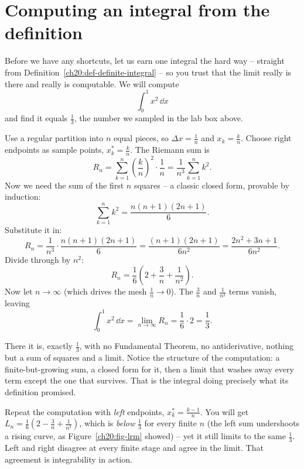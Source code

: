\section{Computing an integral from the definition}
\label{ch20:from-def}

Before we have any shortcuts, let us earn one integral the hard way -- straight
from Definition~\ref{ch20:def-definite-integral} -- so you trust that the limit
really is there and really is computable. We will compute
\[
  \int_0^1 x^2 \, \dd x
\]
and find it equals $\tfrac13$, the number we sampled in the lab box above.

\begin{example}
\label{ch20:ex-x2}
Use a regular partition into $n$ equal pieces, so $\Delta x = \tfrac1n$ and
$x_k = \tfrac{k}{n}$. Choose right endpoints as sample points, $x_k^\ast =
\tfrac{k}{n}$. The Riemann sum is
\[
  R_n = \sum_{k=1}^{n} \left(\frac{k}{n}\right)^2 \cdot \frac{1}{n}
      = \frac{1}{n^3} \sum_{k=1}^{n} k^2.
\]
Now we need the sum of the first $n$ squares -- a classic closed form,
provable by induction:
\[
  \sum_{k=1}^{n} k^2 = \frac{n(n+1)(2n+1)}{6}.
\]
Substitute it in:
\[
  R_n = \frac{1}{n^3} \cdot \frac{n(n+1)(2n+1)}{6}
      = \frac{(n+1)(2n+1)}{6n^2}
      = \frac{2n^2 + 3n + 1}{6n^2}.
\]
Divide through by $n^2$:
\[
  R_n = \frac{1}{6}\left(2 + \frac{3}{n} + \frac{1}{n^2}\right).
\]
Now let $n \to \infty$ (which drives the mesh $\tfrac1n \to 0$). The
$\tfrac{3}{n}$ and $\tfrac{1}{n^2}$ terms vanish, leaving
\[
  \int_0^1 x^2 \,\dd x = \lim_{n\to\infty} R_n
      = \frac{1}{6}\cdot 2 = \frac{1}{3}.
\]
\end{example}

There it is, exactly $\tfrac13$, with no Fundamental Theorem, no antiderivative,
nothing but a sum of squares and a limit. Notice the structure of the
computation: a finite-but-growing sum, a closed form for it, then a limit that
washes away every term except the one that survives. That is the integral doing
precisely what its definition promised.

\begin{labbox}
Repeat the computation with \emph{left} endpoints, $x_k^\ast = \tfrac{k-1}{n}$.
You will get $L_n = \frac{1}{6}\left(2 - \frac{3}{n} + \frac{1}{n^2}\right)$,
which is \emph{below} $\tfrac13$ for every finite $n$ (the left sum undershoots a
rising curve, as Figure~\ref{ch20:fig-lrm} showed) -- yet it still limits to the
same $\tfrac13$. Left and right disagree at every finite stage and agree in the
limit. That agreement is integrability in action.
\end{labbox}

